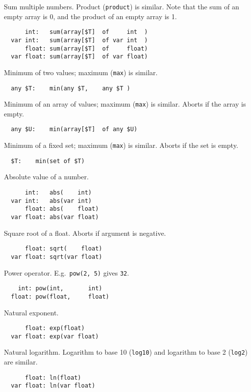 \documentclass[10pt]{scrartcl}
\begin{document}
\builtin{}
Sum multiple numbers.
Product (\texttt{product}) is similar.  Note that the sum of an empty array
is 0, and the product of an empty array is 1.
\begin{verbatim}
      int:   sum(array[$T]  of     int  )
  var int:   sum(array[$T]  of var int  )
      float: sum(array[$T]  of     float)
  var float: sum(array[$T]  of var float)
\end{verbatim}

\builtin{}
Minimum of two values;  maximum (\texttt{max}) is
similar.
\begin{verbatim}
  any $T:    min(any $T,    any $T )
\end{verbatim}

\builtin{}
Minimum of an array of values;  maximum (\texttt{max}) is similar.
Aborts if the array is empty.
\begin{verbatim}
  any $U:    min(array[$T]  of any $U)
\end{verbatim}

\builtin{}
Minimum of a fixed set;  maximum (\texttt{max}) is similar.
Aborts if the set is empty.
\begin{verbatim}
  $T:    min(set of $T)
\end{verbatim}

\builtin{}
Absolute value of a number.
\begin{verbatim}
      int:   abs(    int)
  var int:   abs(var int)
      float: abs(    float)
  var float: abs(var float)
\end{verbatim}

\builtin{}
Square root of a float.  Aborts if argument is negative.
\begin{verbatim}
      float: sqrt(    float)
  var float: sqrt(var float)
\end{verbatim}

\builtin{}
Power operator.  E.g.~\texttt{pow(2, 5)} gives \texttt{32}.
\begin{verbatim}
    int: pow(int,       int)
  float: pow(float,     float)
\end{verbatim}

\builtin{}
Natural exponent.
\begin{verbatim}
      float: exp(float)
  var float: exp(var float)
\end{verbatim}

\builtin{}
Natural logarithm.  Logarithm to base 10 (\texttt{log10}) and logarithm to base
2 (\texttt{log2}) are similar.
\begin{verbatim}
      float: ln(float)
  var float: ln(var float)
\end{verbatim}
\end{document}
